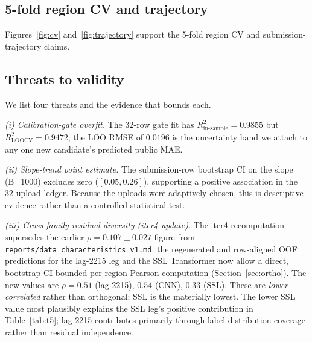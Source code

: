 \documentclass[conference,10pt,a4paper]{IEEEtran}
\begin{document}
\subsection{5-fold region CV and trajectory}
Figures~\ref{fig:cv} and~\ref{fig:trajectory} support the 5-fold region CV and submission-trajectory claims.

\subsection{Threats to validity}
\label{sec:tov}
We list four threats and the evidence that bounds each.

\emph{(i) Calibration-gate overfit.} The 32-row gate fit has $R^2_{\mathrm{in\text{-}sample}}=0.9855$ but $R^2_{\mathrm{LOOCV}}=0.9472$; the LOO RMSE of $0.0196$ is the uncertainty band we attach to any one new candidate's predicted public MAE.

\emph{(ii) Slope-trend point estimate.} The submission-row bootstrap CI on the slope (B=1000) excludes zero ($[0.05, 0.26]$), supporting a positive association in the 32-upload ledger. Because the uploads were adaptively chosen, this is descriptive evidence rather than a controlled statistical test.

\emph{(iii) Cross-family residual diversity (iter4 update).} The iter4 recomputation supersedes the earlier $\rho = 0.107 \pm 0.027$ figure from \texttt{reports/data\_characteristics\_v1.md}: the regenerated and row-aligned OOF predictions for the lag-2215 leg and the SSL Transformer now allow a direct, bootstrap-CI bounded per-region Pearson computation (Section~\ref{sec:ortho}). The new values are $\rho{=}0.51$ (lag-2215), $0.54$ (CNN), $0.33$ (SSL). These are \emph{lower-correlated} rather than orthogonal; SSL is the materially lowest. The lower SSL value most plausibly explains the SSL leg's positive contribution in Table~\ref{tab:t5}; lag-2215 contributes primarily through label-distribution coverage rather than residual independence.
\end{document}
